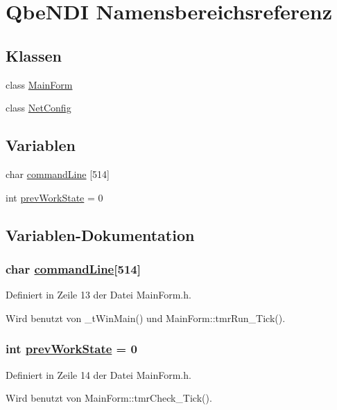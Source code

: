 \hypertarget{namespaceQbeNDI}{
\section{Qbe\-NDI Namensbereichsreferenz}
\label{namespaceQbeNDI}
}




\subsection*{Klassen}
\begin{CompactItemize}
\item 
class \hyperlink{classQbeNDI_1_1MainForm}{Main\-Form}
\item 
class \hyperlink{classQbeNDI_1_1NetConfig}{Net\-Config}
\end{CompactItemize}
\subsection*{Variablen}
\begin{CompactItemize}
\item 
char \hyperlink{namespaceQbeNDI_a0}{command\-Line} \mbox{[}514\mbox{]}
\item 
int \hyperlink{namespaceQbeNDI_a1}{prev\-Work\-State} = 0
\end{CompactItemize}


\subsection{Variablen-Dokumentation}
\hypertarget{namespaceQbeNDI_a0}{
\subsubsection[commandLine]{\setlength{\rightskip}{0pt plus 5cm}char \hyperlink{namespaceQbeNDI_a0}{command\-Line}\mbox{[}514\mbox{]}}}
\label{namespaceQbeNDI_a0}




Definiert in Zeile 13 der Datei Main\-Form.h.

Wird benutzt von \_\-t\-Win\-Main() und Main\-Form::tmr\-Run\_\-Tick().\hypertarget{namespaceQbeNDI_a1}{
\subsubsection[prevWorkState]{\setlength{\rightskip}{0pt plus 5cm}int \hyperlink{namespaceQbeNDI_a1}{prev\-Work\-State} = 0}}
\label{namespaceQbeNDI_a1}




Definiert in Zeile 14 der Datei Main\-Form.h.

Wird benutzt von Main\-Form::tmr\-Check\_\-Tick().